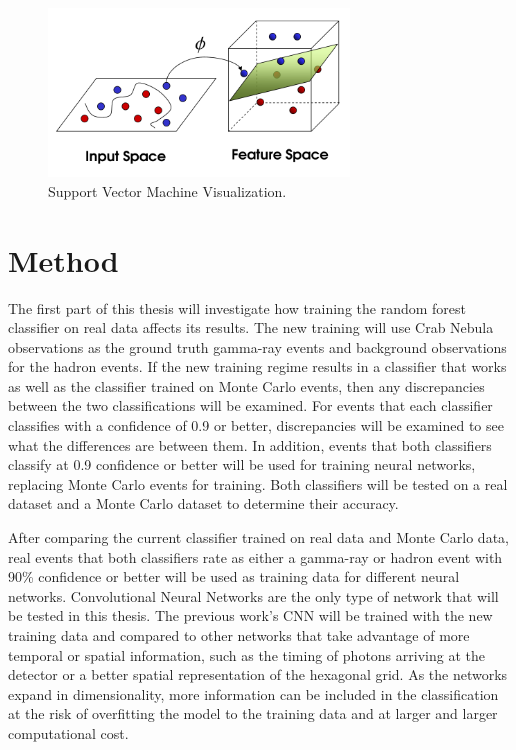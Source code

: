 \documentclass[12pt]{article}
\begin{document}
\begin{figure}[!htb]
\centering
\includegraphics[width=8cm, keepaspectratio]{svm.png}
\caption{Support Vector Machine Visualization.}
\label{fig:svm}
\end{figure}

\section{Method}\label{sec:method}

The first part of this thesis will investigate how training the random forest classifier on real data affects its results. The new training will use Crab Nebula observations as the ground truth gamma-ray events and background observations for the hadron events. If the new training regime results in a classifier that works as well as the classifier trained on Monte Carlo events, then any discrepancies between the two classifications will be examined. For events that each classifier classifies with a confidence of 0.9 or better, discrepancies will be examined to see what the differences are between them. In addition, events that both classifiers classify at 0.9 confidence or better will be used for training neural networks, replacing Monte Carlo events for training. Both classifiers will be tested on a real dataset and a Monte Carlo dataset to determine their accuracy. 

After comparing the current classifier trained on real data and Monte Carlo data, real events that both classifiers rate as either a gamma-ray or hadron event with 90\% confidence or better will be used as training data for different neural networks. Convolutional Neural Networks are the only type of network that will be tested in this thesis. The previous work's CNN will be trained with the new training data and compared to other networks that take advantage of more temporal or spatial information, such as the timing of photons arriving at the detector or a better spatial representation of the hexagonal grid. As the networks expand in dimensionality, more information can be included in the classification at the risk of overfitting the model to the training data and at larger and larger computational cost. 
\end{document}
